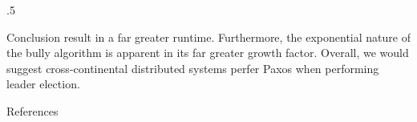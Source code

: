\documentclass[final,hyperref={pdfpagelabels=false, colorlinks=true, urlcolor=unsw@blue}]{beamer}
\begin{document}
\begin{frame}{}
\begin{columns}[t]
\begin{column}{.5\linewidth}
\begin{mybox}{Conclusion}
        result in a far greater runtime.
        Furthermore, the exponential nature of the bully algorithm is apparent in its far greater growth factor. 
        Overall, we would suggest cross-continental distributed systems perfer Paxos when performing leader election.
      \end{mybox}
      \begin{mybox}{References}
        \nocite{*}
        \printbibliography[env=nolabel]
      \end{mybox}
    \end{column}
  \end{columns}
  \vfill
\end{frame}
\end{document}
